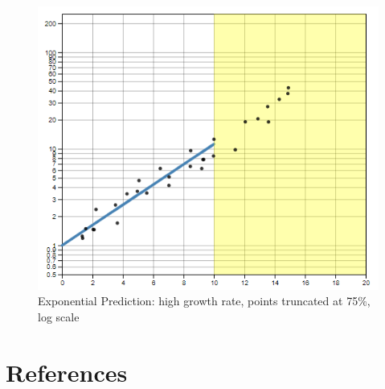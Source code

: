 \documentclass[print]{nuthesis}
\begin{document}
\begin{figure}[tbp]

{\centering \includegraphics[width=0.65\linewidth,]{images/high-15-log} 

}

\caption{Exponential Prediction: high growth rate, points truncated at 75\%, log scale}\label{fig:high-15-log}
\end{figure}

\backmatter

\hypertarget{references}{%
\chapter*{References}\label{references}}

\noindent

\setlength{\parindent}{-0.20in}
\setlength{\leftskip}{0.20in}
\setlength{\parskip}{8pt}
\end{document}
